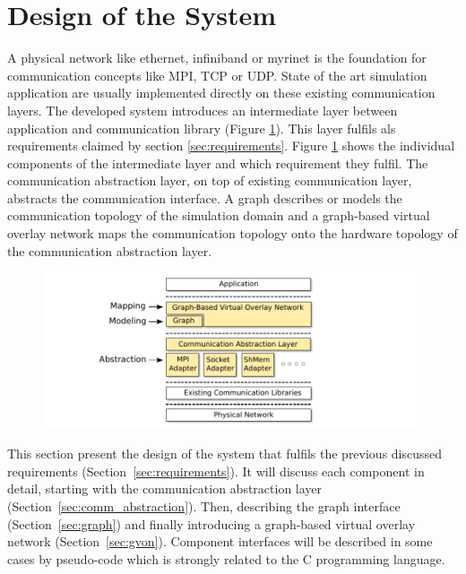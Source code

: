 \section{Design of the System}

A physical network like ethernet, infiniband or myrinet is the
foundation for communication concepts like MPI, TCP or UDP.  State of
the art simulation application are usually implemented directly on
these existing communication layers. The developed system introduces
an intermediate layer between application and communication library
(Figure \ref{fig:design}). This layer fulfils als requirements claimed
by section \ref{sec:requirements}. Figure \ref{fig:design} shows the
individual components of the intermediate layer and which requirement
they fulfil. The communication abstraction layer, on top of existing
communication layer, abstracts the communication interface.  A graph
describes or models the communication topology of the simulation
domain and a graph-based virtual overlay network maps the
communication topology onto the hardware topology of the communication
abstraction layer.

\begin{figure}[H]
  \centering \includegraphics[width=\textwidth]{graphics/30_design}
  \caption{}
  \label{fig:design}
\end{figure}

This section present the design of the system that fulfils the
previous discussed requirements (Section~\ref{sec:requirements}).  It
will discuss each component in detail, starting with the communication
abstraction layer (Section~\ref{sec:comm_abstraction}). Then,
describing the graph interface (Section~\ref{sec:graph}) and finally
introducing a graph-based virtual overlay network
(Section~\ref{sec:gvon}). Component interfaces will be described in
some cases by pseudo-code which is strongly related to the C
programming language.

